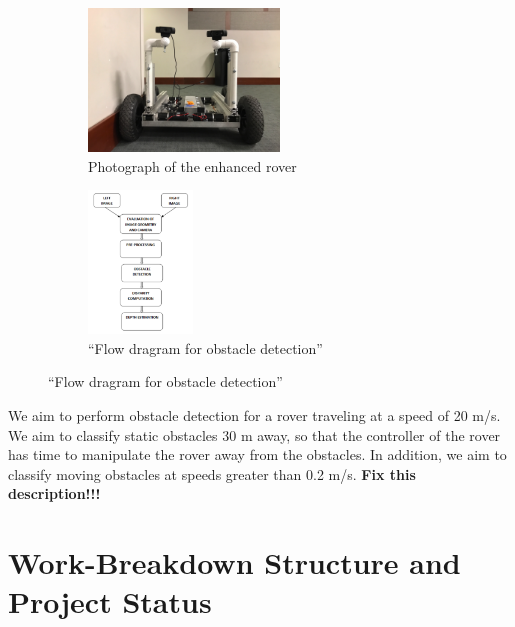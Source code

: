 \documentclass[letter,12pt]{article}
\begin{document}
\begin{figure}[h]
\centering
	\begin{subfigure}[b]{0.4\textwidth}
	\centering
	\includegraphics[height=1.5in]{./pics/rover}
	\caption{Photograph of the enhanced rover}
	\label{fig:rover}
	\end{subfigure}
	\begin{subfigure}[b]{0.4\textwidth}
	\centering
	\includegraphics[height=1.5in]{./pics/flow-dragram-for-obstacle-detection}
	\caption{``Flow dragram for obstacle detection'' \cite{Deshmukh2015}}
	\label{fig:flow-dragram-for-obstacle-detection}
	\end{subfigure}
\end{figure}




We aim to perform obstacle detection for a rover traveling at a speed of 20 m/s. We aim to classify static obstacles 30 m away, so that the controller of the rover has time to manipulate the rover away from the obstacles. In addition, we aim to classify moving obstacles at speeds greater than 0.2 m/s. {\Huge \bf Fix this description!!!}




\section{Work-Breakdown Structure and Project Status}
\label{sec:WorkBreakdownStructureAndProjectStatus}
\end{document}
